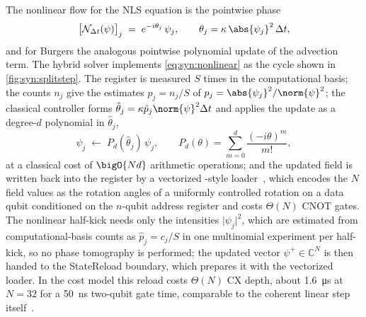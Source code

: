 The nonlinear flow for the NLS equation is the pointwise phase
\begin{equation}\label{eq:syn:nonlinear}
  \big[\mathcal{N}_{\Delta t}(\psi)\big]_j \;=\; e^{-i\theta_j}\,\psi_j,\qquad \theta_j=\kappa\,\abs{\psi_j}^{2}\,\Delta t ,
\end{equation}
and for Burgers the analogous pointwise polynomial update of the advection term. The hybrid solver implements \cref{eq:syn:nonlinear} as the cycle shown in \cref{fig:syn:splitstep}. The register is measured $S$ times in the computational basis; the counts $n_j$ give the estimates $\hat p_j=n_j/S$ of $p_j=\abs{\psi_j}^{2}/\norm{\psi}^{2}$; the classical controller forms $\hat\theta_j=\kappa\hat p_j\norm{\psi}^{2}\Delta t$ and applies the update as a degree-$d$ polynomial in $\hat\theta_j$,
\begin{equation}\label{eq:syn:poly}
  \psi_j \;\leftarrow\; P_d(\hat\theta_j)\,\psi_j,\qquad P_d(\theta)=\sum_{m=0}^{d}\frac{(-i\theta)^{m}}{m!},
\end{equation}
at a classical cost of $\bigO{Nd}$ arithmetic operations; and the updated field is written back into the register by a vectorized \qcrank{}-style loader~\cite{balewski2024qcrank,mottonen2004ucr}, which encodes the $N$ field values as the rotation angles of a uniformly controlled rotation on a data qubit conditioned on the $n$-qubit address register and costs $\Theta(N)$ CNOT gates. The nonlinear half-kick needs only the intensities $\lvert\psi_j\rvert^{2}$, which are estimated from computational-basis counts as $\hat p_j=c_j/S$ in one multinomial experiment per half-kick, so no phase tomography is performed; the updated vector $\psi^{+}\in\mathbb{C}^{N}$ is then handed to the StateReload boundary, which prepares it with the vectorized loader. In the cost model this reload costs $\Theta(N)$ CX depth, about \SI{1.6}{\micro\second} at $N=32$ for a \SI{50}{\nano\second} two-qubit gate time, comparable to the coherent linear step itself~\cite{guo2026nonlinearwaves}.

